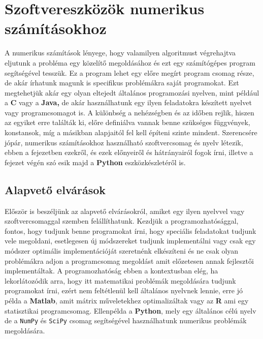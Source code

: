 
\section{Szoftvereszközök numerikus
számításokhoz}\label{szoftvereszkuxf6zuxf6k-numerikus-szuxe1muxedtuxe1sokhoz}

    A numerikus számítások lényege, hogy valamilyen algoritmust végrehajtva
eljutunk a probléma egy közelítő megoldásához és ezt egy számítógépes
program segítségével tesszük. Ez a program lehet egy előre megírt
program csomag része, de akár írhatunk magunk is specifikus problémákra
saját programokat. Ezt megtehetjük akár egy olyan eltejedt általános
programozási nyelven, mint például a \textbf{C} vagy a \textbf{Java,} de
akár használhatunk egy ilyen feladatokra készített nyelvet vagy
programcsomagot is. A különbség a nehézségben és az időben rejlik,
hiszen az egyiket erre találták ki, előre definiálva vannak benne
szükséges függvények, konstansok, míg a másikban alapjaitól fel kell
építeni szinte mindent. Szerencsére jópár, numerikus számításokhoz
használható szoftvercsomag és nyelv létezik, ebben a fejezetben ezekről,
és ezek előnyeiről és hátrányairól fogok írni, illetve a fejezet végén
szó esik majd a \textbf{Python} eszközkészletéről is.

    \subsection{Alapvető elvárások}\label{alapvetux151-elvuxe1ruxe1sok}

    Először is beszéljünk az alapvető elvárásokról, amiket egy ilyen
nyelvvel vagy szoftvercsomaggal szemben felállíthatunk. Kezdjük a
programozhatósággal, fontos, hogy tudjunk benne programokat írni, hogy
speciális feladatokat tudjunk vele megoldani, esetlegesen új módszereket
tudjunk implementálni vagy csak egy módszer optimális implementációját
szeretnénk elkészíteni és ne csak olyan problémákra adjon a
programcsomag megoldást amit előzetesen annak fejlesztői implementáltak.
A programozhatóság ebben a kontextusban elég, ha lekorlátozódik arra,
hogy itt matematikai problémák megoldására tudjunk programokat írni,
ezért nem feltétlenül kell általános nyelvnek lennie, erre jó példa a
\textbf{Matlab}, amit mátrix műveletekhez optimalizáltak vagy az
\textbf{R} ami egy statisztikai programcsomag. Ellenpélda a
\textbf{Python}, mely egy általános célú nyelv de a \texttt{NumPy} és
\texttt{SciPy} csomag segítségével használhatunk numerikus problémák
megoldására.

